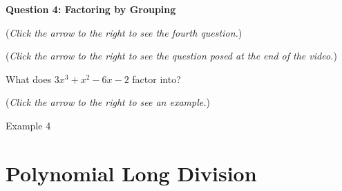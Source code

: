 \documentclass{ximera}
\begin{document}
\textbf{Question 4: Factoring by Grouping}
\begin{question}
\begin{flushright}
{\color{blue}(\emph{Click the arrow to the right to see the fourth question.})}
\end{flushright}
\begin{center}
\begin{expandable}
\begin{flushright}
{\color{blue}(\emph{Click the arrow to the right to see the  question
posed at the end of the video.})}
\end{flushright}
\begin{expandable}
What does $3x^3+x^2-6x-2$ factor into?
\begin{multipleChoice}
\end{multipleChoice}
\begin{flushright}
{\color{blue}(\emph{Click the arrow to the right to see an example.})}
\end{flushright}
\begin{expandable}
\begin{center}
Example 4
\end{center}
\end{expandable}
\end{expandable}
\end{expandable}
\end{center}
\end{question}


\section{Polynomial Long Division}
\end{document}
